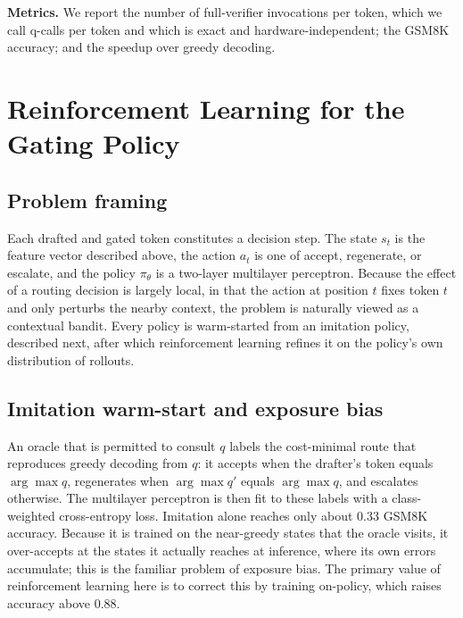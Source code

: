 \documentclass[11pt]{article}
\begin{document}
\textbf{Metrics.} We report the number of full-verifier invocations per token, which we call q-calls
per token and which is exact and hardware-independent; the GSM8K accuracy; and the speedup over greedy
decoding.

\section{Reinforcement Learning for the Gating Policy}

\subsection{Problem framing}
Each drafted and gated token constitutes a decision step. The state $s_t$ is the feature vector
described above, the action $a_t$ is one of accept, regenerate, or escalate, and the policy
$\pi_\theta$ is a two-layer multilayer perceptron. Because the effect of a routing decision is largely
local, in that the action at position $t$ fixes token $t$ and only perturbs the nearby context, the
problem is naturally viewed as a contextual bandit. Every policy is warm-started from an imitation
policy, described next, after which reinforcement learning refines it on the policy's own distribution
of rollouts.

\subsection{Imitation warm-start and exposure bias}
An oracle that is permitted to consult $q$ labels the cost-minimal route that reproduces greedy
decoding from $q$: it accepts when the drafter's token equals $\arg\max q$, regenerates when
$\arg\max q'$ equals $\arg\max q$, and escalates otherwise. The multilayer perceptron is then fit to
these labels with a class-weighted cross-entropy loss. Imitation alone reaches only about 0.33 GSM8K
accuracy. Because it is trained on the near-greedy states that the oracle visits, it over-accepts at
the states it actually reaches at inference, where its own errors accumulate; this is the familiar
problem of exposure bias. The primary value of reinforcement learning here is to correct this by
training on-policy, which raises accuracy above 0.88.
\end{document}
